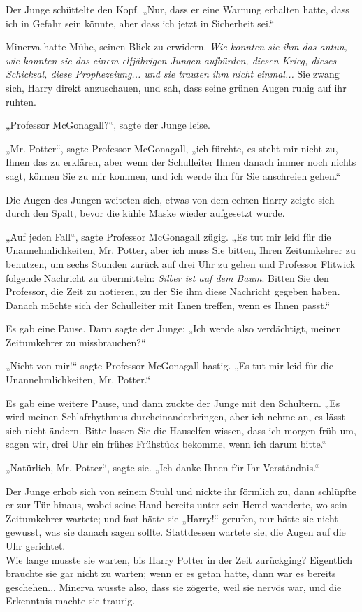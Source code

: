 {Der Junge schüttelte den Kopf. „Nur, dass er eine Warnung erhalten hatte, dass ich in Gefahr sein könnte, aber dass ich jetzt in Sicherheit sei.“

Minerva hatte Mühe, seinen Blick zu erwidern. \emph{Wie konnten sie ihm das antun, wie konnten sie das einem elfjährigen Jungen aufbürden, diesen Krieg, dieses Schicksal, diese Prophezeiung... und sie trauten ihm nicht einmal...} Sie zwang sich, Harry direkt anzuschauen, und sah, dass seine grünen Augen ruhig auf ihr ruhten.

„Professor McGonagall?“, sagte der Junge leise.

„Mr. Potter“, sagte Professor McGonagall, „ich fürchte, es steht mir nicht zu, Ihnen das zu erklären, aber wenn der Schulleiter Ihnen danach immer noch nichts sagt, können Sie zu mir kommen, und ich werde ihn für Sie anschreien gehen.“

Die Augen des Jungen weiteten sich, etwas von dem echten Harry zeigte sich durch den Spalt, bevor die kühle Maske wieder aufgesetzt wurde.

„Auf jeden Fall“, sagte Professor McGonagall zügig. „Es tut mir leid für die Unannehmlichkeiten, Mr. Potter, aber ich muss Sie bitten, Ihren Zeitumkehrer zu benutzen, um sechs Stunden zurück auf drei Uhr zu gehen und Professor Flitwick folgende Nachricht zu übermitteln: \emph{Silber ist auf dem Baum}. Bitten Sie den Professor, die Zeit zu notieren, zu der Sie ihm diese Nachricht gegeben haben. Danach möchte sich der Schulleiter mit Ihnen treffen, wenn es Ihnen passt.“

Es gab eine Pause. Dann sagte der Junge: „Ich werde also verdächtigt, meinen Zeitumkehrer zu missbrauchen?“

„Nicht von mir!“ sagte Professor McGonagall hastig. „Es tut mir leid für die Unannehmlichkeiten, Mr. Potter.“

Es gab eine weitere Pause, und dann zuckte der Junge mit den Schultern. „Es wird meinen Schlafrhythmus durcheinanderbringen, aber ich nehme an, es lässt sich nicht ändern. Bitte lassen Sie die Hauselfen wissen, dass ich morgen früh um, sagen wir, drei Uhr ein frühes Frühstück bekomme, wenn ich darum bitte.“

„Natürlich, Mr. Potter“, sagte sie. „Ich danke Ihnen für Ihr Verständnis.“

Der Junge erhob sich von seinem Stuhl und nickte ihr förmlich zu, dann schlüpfte er zur Tür hinaus, wobei seine Hand bereits unter sein Hemd wanderte, wo sein Zeitumkehrer wartete; und fast hätte sie „Harry!“ gerufen, nur hätte sie nicht gewusst, was sie danach sagen sollte. Stattdessen wartete sie, die Augen auf die Uhr gerichtet.\\ Wie lange musste sie warten, bis Harry Potter in der Zeit zurückging? Eigentlich brauchte sie gar nicht zu warten; wenn er es getan hatte, dann war es bereits geschehen... Minerva wusste also, dass sie zögerte, weil sie nervös war, und die Erkenntnis machte sie traurig.

}
